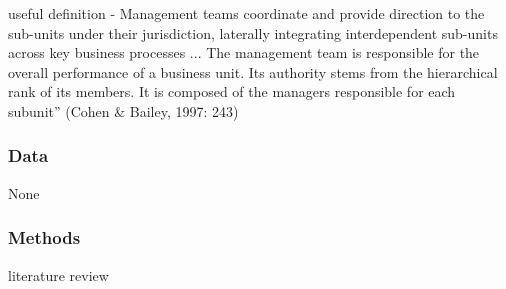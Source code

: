 \documentclass[12pt]{article}
\begin{document}
useful definition - Management teams coordinate and provide direction to the sub-units under their jurisdiction, laterally integrating interdependent sub-units across key business processes ... The management team is responsible for the overall performance of a business unit. Its authority stems from the hierarchical rank of its members. It is composed of the managers responsible for each subunit” (Cohen \& Bailey, 1997: 243)


\subsubsection*{Data}

None

\subsubsection*{Methods}

literature review




\end{document}
